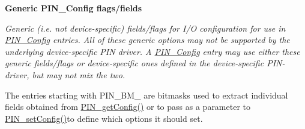 \begin{Indent}{\bf Generic P\+I\+N\+\_\+\+Config flags/fields}\par
{\em \label{_p_i_n_8h_PIN_GENERIC_FLAGS}%
\hypertarget{_p_i_n_8h_PIN_GENERIC_FLAGS}{}%
 Generic (i.\+e. not device-\/specific) fields/flags for I/\+O configuration for use in \hyperlink{_p_i_n_8h_ae427b7d2925f9b0f3145e455cfdb5841}{P\+I\+N\+\_\+\+Config} entries. All of these generic options may not be supported by the underlying device-\/specific P\+I\+N driver. A \hyperlink{_p_i_n_8h_ae427b7d2925f9b0f3145e455cfdb5841}{P\+I\+N\+\_\+\+Config} entry may use either these generic fields/flags or device-\/specific ones defined in the device-\/specific P\+I\+N-\/driver, but may not mix the two.

The entries starting with P\+I\+N\+\_\+\+B\+M\+\_\+ are bitmasks used to extract individual fields obtained from \hyperlink{_p_i_n_8h_aed24cb96de8fa957e9f7c05dd239f2f9}{P\+I\+N\+\_\+get\+Config()} or to pass as a parameter to \hyperlink{_p_i_n_8h_a4b9fbd1a86e63d2f14f679b87f17c857}{P\+I\+N\+\_\+set\+Config()}to define which options it should set.

}
\end{Indent}
